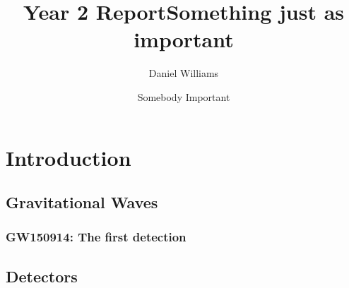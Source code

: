 \documentclass[openleft]{kentigern}
\title{Year 2 Report}
\author{Daniel Williams}
\theoremstyle{definition}
\begin{document}

\begin{titlepage}
\thispagestyle{empty}
\author{Somebody Important}
\title{Something just as important}
\maketitle
\restoregeometry
\end{titlepage}

\newpage
%

\newpage
%


\part{Introduction}
\label{part:intro}


 \chapter{Gravitational Waves}
 \label{cha:grav-waves}




% 

\section{GW150914: The first detection}
\label{sec:gw150914:-first-dete}



 \chapter{Detectors}
 \label{cha:detectors}
\end{document}
